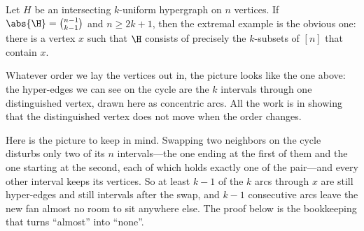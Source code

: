 \begin{boxtheorem} \label{Ch1:Thm:EKR_Extremal}
    Let $H$ be an intersecting $k$-uniform hypergraph on $n$ vertices. If $\abs{\H} = \binom{n-1}{k-1}$ and $n \geq 2k + 1$, then the extremal example is the obvious one: there is a vertex $x$ such that $\H$ consists of precisely the $k$-subsets of $[n]$ that contain $x$.
\end{boxtheorem}

\begin{figure}[H]
    \centering
\end{figure}

Whatever order we lay the vertices out in, the picture looks like the one above: the hyper-edges we can see on the cycle are the $k$ intervals through one distinguished vertex, drawn here as concentric arcs. All the work is in showing that the distinguished vertex does not move when the order changes.


Here is the picture to keep in mind. Swapping two neighbors on the cycle disturbs only two of its $n$ intervals---the one ending at the first of them and the one starting at the second, each of which holds exactly one of the pair---and every other interval keeps its vertices. So at least $k - 1$ of the $k$ arcs through $x$ are still hyper-edges and still intervals after the swap, and $k - 1$ consecutive arcs leave the new fan almost no room to sit anywhere else. The proof below is the bookkeeping that turns ``almost'' into ``none''.

\begin{figure}[H]
    \centering
\end{figure}

